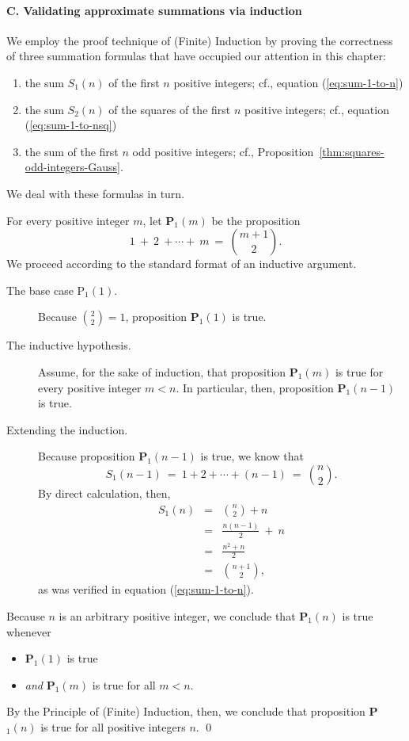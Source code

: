 \paragraph{\sf C. Validating approximate summations via induction}
We employ the proof technique of (Finite) Induction by proving the
correctness of three summation formulas that have occupied our
attention in this chapter:
\begin{enumerate}
\item
the sum $S_1(n)$ of the first $n$ positive integers; cf., equation
(\ref{eq:sum-1-to-n})

\item
the sum $S_2(n)$ of the squares of the first $n$ positive integers;
cf., equation (\ref{eq:sum-1-to-nsq})

\item
the sum of the first $n$ odd positive integers; cf.,
Proposition~\ref{thm:squares-odd-integers-Gauss}.
\end{enumerate}
We deal with these formulas in turn.

%
For every positive integer $m$, let {\bf P}$_1(m)$ be the proposition
\[  1 \ + \ 2 \ +  \cdots  + \ m \ = \ {{m+1} \choose 2}. \]
We proceed according to the standard format of an inductive argument.

\begin{description}
\item[{\sf The base case P$_1(1)$}.]
%
Because ${\displaystyle {2 \choose 2}} = 1$, proposition {\bf P}$_1(1)$
is true.

\item[{\sf The inductive hypothesis}.]
%
Assume, for the sake of induction, that proposition {\bf P}$_1(m)$ is
true for every positive integer $m < n$.  In particular, then,
proposition {\bf P}$_1(n-1)$ is true.

\item[{\sf Extending the induction}.]
%
Because proposition {\bf P}$_1(n-1)$ is true, we know that
\[ S_1(n-1) \ = \ 1 + 2 + \cdots + (n-1) \ = \ {n \choose 2}.  \]
By direct calculation, then,
\begin{eqnarray*}
S_1(n) & = & {n \choose 2} + n \\
  & = & \frac{n(n-1)}{2}  \ + \ n \\ 
  & = & \frac{n^2 + n}{2} \\
  & = & {{n+1} \choose 2},
\end{eqnarray*}
as was verified in equation (\ref{eq:sum-1-to-n}).
\end{description}
Because $n$ is an arbitrary positive integer, we conclude that
{\bf P}$_1(n)$ is true whenever
\begin{itemize}
\item
{\bf P}$_1(1)$ is true
\item
{\em and}
{\bf P}$_1(m)$ is true for all $m < n$.
\end{itemize}
By the Principle of (Finite) Induction, then, we conclude that
proposition {\bf P}$_1(n)$ is true for all positive integers $n$.
\qed

